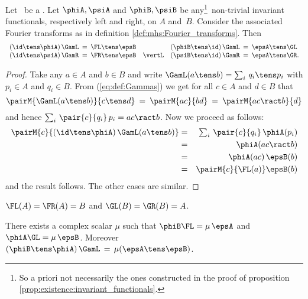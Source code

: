 \begin{lemma_sec} \label{lemma:mhs:Fourier_transforms}
Let\/ \pairAB\ be a \mhs\@. Let\/ $\phiA, \psiA$ and\/ $\phiB, \psiB$ be
any\footnote{So a priori not necessarily the ones constructed in
the proof of proposition \ref{prop:existence:invariant_functionals}.}\
non-trivial invariant functionals, respectively left and right, on $A$ \mbox{and\/ $B$}\@.
Consider the associated Fourier transforms as in definition
\ref{def:mhs:Fourier_transforms}\@. Then
$$\begin{array}{lll}
    (\id \tens \phiA)\, \GamL \:=\: \FL \tens \epsB   & \hspace{3em} &
    (\phiB \tens \id)\, \GamL \:=\: \epsA \tens \GL
  \\
    (\id \tens \psiA)\, \GamR \:=\: \FR \tens \epsB   & \vertL &
    (\psiB \tens \id)\, \GamR \:=\: \epsA \tens \GR.
  \end{array}$$
\end{lemma_sec}

\begin{proof}
Take any $a \in A$ and $b\in B$ and write
$\GamL(a \tens b) = \sum_i \,q_i \tens p_i$ with $p_i \in A$ and $q_i \in B$.
From (\ref{eq:def:Gammas}) we get for all $c \in A$ and $d\in B$ that
$$ \pairM{\GamL(a \tens b)}{c \tens d} \:=\: \pairM{ac}{bd} \:=\: \pairM{ac \ract b}{d}   $$
and hence $\sum_i \,\pair{c}{q_i} \, p_i = ac \ract b$. Now we proceed as follows:
\begin{eqnarray*}
\pairM{c}{(\id \tens \phiA)\, \GamL(a \tens b)}
  &=&
\textstyle \sum_i \,\pair{c}{q_i} \, \phiA(p_i)
\\&=&
\phiA(ac \ract b)
\\&=&
\phiA(ac) \,\epsB(b)
\\&=&
\pairM{c}{\FL(a)}  \epsB(b)
\end{eqnarray*}
and the result follows. The other cases are similar.
\end{proof}


\begin{cor_sec} \label{cor:mhs:Fourier_transforms}
$\FL(A) = \FR(A) = B$ and\/ $\GL(B) = \GR(B) = A$.
\end{cor_sec}


\begin{cor_sec}  \label{cor:mhs:unique_Haar}
There exists a complex scalar\/ $\mu$ such that\/ $\phiB \FL = \mu \, \epsA$
and\/ $\phiA \GL = \mu \, \epsB$.
Moreover\/ $(\phiB \tens \phiA)\, \GamL \,=\, \mu (\epsA \tens \epsB)$.
\end{cor_sec}


